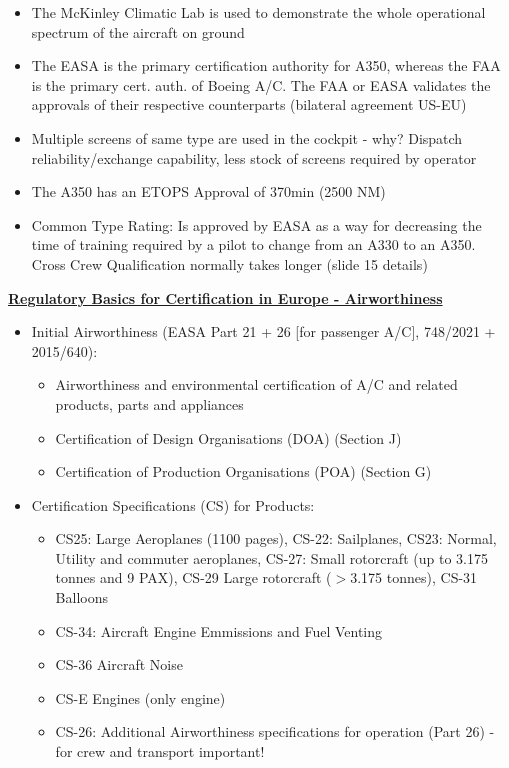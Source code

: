 \documentclass[9pt, landscape, fleqn]{scrartcl}
\begin{document}
\begin{multicols*}{3}
\begin{itemize}
    \item The McKinley Climatic Lab is used to demonstrate the whole operational spectrum of the aircraft on ground 
    \item The EASA is the primary certification authority for A350, whereas the FAA is the primary cert. auth. of Boeing A/C. The FAA or EASA validates the approvals of their respective counterparts (bilateral agreement US-EU)
    \item Multiple screens of same type are used in the cockpit - why? Dispatch reliability/exchange capability, less stock of screens required by operator
    \item The A350 has an ETOPS Approval of 370min (2500 NM)
    \item Common Type Rating: Is approved by EASA as a way for decreasing the time of training required by a pilot to change from an  A330 to an A350. Cross Crew Qualification normally takes longer (slide 15 details)
\end{itemize}
\underline{\textbf{Regulatory Basics for Certification in Europe - Airworthiness}}
\begin{itemize}
    \item Initial Airworthiness (EASA Part 21 + 26 [for passenger A/C], 748/2021 + 2015/640): 
    \begin{itemize}
        \item Airworthiness and environmental certification of A/C and related products, parts and appliances
        \item Certification of Design Organisations (DOA) (Section J)
        \item Certification of Production Organisations (POA) (Section G)
    \end{itemize}
    \item Certification Specifications (CS) for Products:
    \begin{itemize}
        \item CS25: Large Aeroplanes (1100 pages), CS-22: Sailplanes, CS23: Normal, Utility and commuter aeroplanes, CS-27: Small rotorcraft (up to 3.175 tonnes and 9 PAX), CS-29 Large rotorcraft ($>$3.175 tonnes), CS-31 Balloons
        \item CS-34: Aircraft Engine Emmissions and Fuel Venting
        \item CS-36 Aircraft Noise 
        \item CS-E Engines (only engine)
        \item CS-26: Additional Airworthiness specifications for operation (Part 26) - for crew and transport important!

\end{itemize}
\end{itemize}
\end{multicols*}
\end{document}
